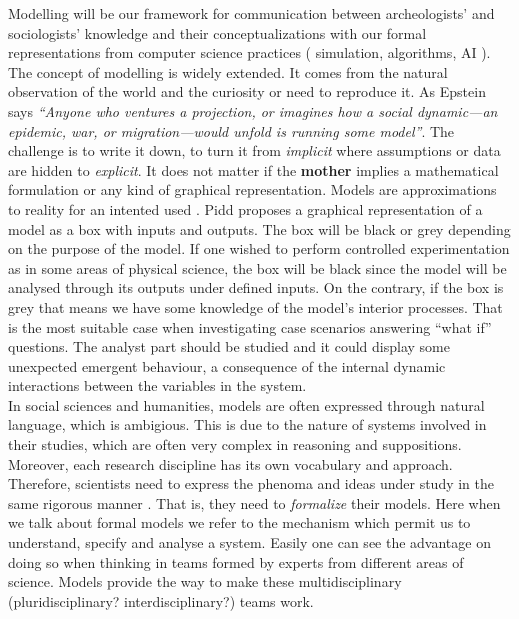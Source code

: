 \documentclass{report}
\begin{document}
Modelling will be our framework for communication between archeologists' and sociologists' knowledge and their conceptualizations with our formal representations from computer science practices ( simulation, algorithms, AI ).\\
The concept of modelling is widely extended. It comes from the natural observation of the world and the curiosity or need to reproduce it.
As Epstein \cite{Epstein2008} says \textit{“Anyone who ventures a projection, or imagines how a social 
dynamic—an epidemic, war, or migration—would unfold is running some model”}. The challenge is to write it down, to turn it from \textit{implicit} where
assumptions or data are hidden to \textit{explicit}. It does not matter if the \textbf{mother} implies a mathematical formulation or any kind of graphical representation. Models are approximations to reality for an intented used \cite{Pidd2010}. Pidd proposes a graphical representation of a model as a box with inputs and outputs. The box will be black or grey depending on the purpose of the model. If one wished to perform controlled experimentation as in some areas of physical science, the box will be black since the model will be analysed through its outputs under defined inputs. On the contrary, if the box is grey that means we have some knowledge of the model's interior processes. That is the most suitable case when investigating case scenarios answering ``what if'' questions. The analyst part should be studied and it could display some unexpected emergent behaviour, a consequence of the internal dynamic interactions between the variables in the system. \\

In social sciences and humanities, models are often expressed through natural language, which is ambigious. This is due to the nature of systems involved in their studies, which are often very complex in reasoning and suppositions. Moreover, each research discipline has its own vocabulary and approach. Therefore, scientists need to express the phenoma and ideas under study in the same rigorous manner \cite{Leeuw2004}. That is, they need to \textit{formalize} their models. Here when we talk about formal models we refer to the mechanism which permit us to understand, specify and analyse a system. Easily one can see the advantage on doing so when thinking in teams formed by experts from different areas of science. Models provide the way to make these multidisciplinary (pluridisciplinary? interdisciplinary?) teams work.\\
\end{document}
